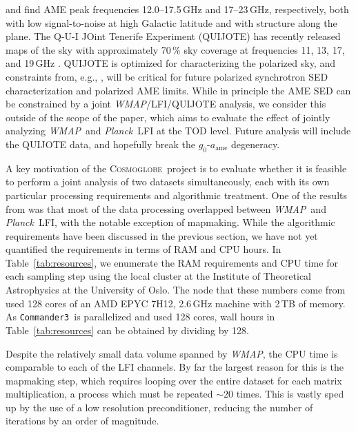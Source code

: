 \documentclass[twocolumn]{../../common/aa}
\def\WMAP{\emph{WMAP}}
\def\Planck{\emph{Planck}}
\def\commanderthree{\texttt{Commander3}}
\newcommand{\cosmoglobe}{\textsc{Cosmoglobe}}
\begin{document}
\citet{bennett2012} and \citet{planck2014-a12} find AME peak frequencies 12.0--17.5\,GHz and 17--23\,GHz, respectively, both with low signal-to-noise at high Galactic latitude and with structure along the plane. The Q-U-I JOint Tenerife Experiment (QUIJOTE) has recently released maps of the sky with approximately 70\,\% sky coverage at frequencies 11, 13, 17, and 19\,GHz \citep{QUIJOTE_IV}. QUIJOTE is optimized for characterizing the polarized sky, and constraints from, e.g., \citet{QUIJOTE_VIII}, will be critical for future polarized synchrotron SED characterization and polarized AME limits. While in principle the AME SED can be constrained by a joint \WMAP/LFI/QUIJOTE analysis, we consider this outside of the scope of the paper, which aims to evaluate the effect of jointly analyzing \WMAP\ and \Planck\ LFI at the TOD level.  Future analysis will include the QUIJOTE data, and hopefully break the $g_0$-$a_\mathrm{ame}$ degeneracy.




A key motivation of the \cosmoglobe\ project is to evaluate whether it is feasible to perform a joint analysis of two datasets simultaneously, each with its own particular processing requirements and algorithmic treatment. One of the results from \citet{bp17} was that most of the data processing overlapped between \WMAP\ and \Planck\ LFI, with the notable exception of mapmaking. While the algorithmic requirements have been discussed in the previous section, we have not yet quantified the requirements in terms of RAM and CPU hours. In Table~\ref{tab:resources}, we enumerate the RAM requirements and CPU time for each sampling step using the local cluster at the Institute of Theoretical Astrophysics at the University of Oslo. The node that these numbers come from used 128 cores of an AMD EPYC 7H12, 2.6\,GHz machine with 2\,TB of memory. As \commanderthree\ is parallelized and used 128 cores, wall hours in Table~\ref{tab:resources} can be obtained by dividing by 128.

Despite the relatively small data volume spanned by \WMAP, the CPU time is comparable to each of the LFI channels.  By far the largest reason for this is the mapmaking step, which requires looping over the entire dataset for each matrix multiplication, a process which must be repeated $\sim20$ times. This is vastly sped up by the use of a low resolution preconditioner, reducing the number of iterations by an order of magnitude.
\end{document}
